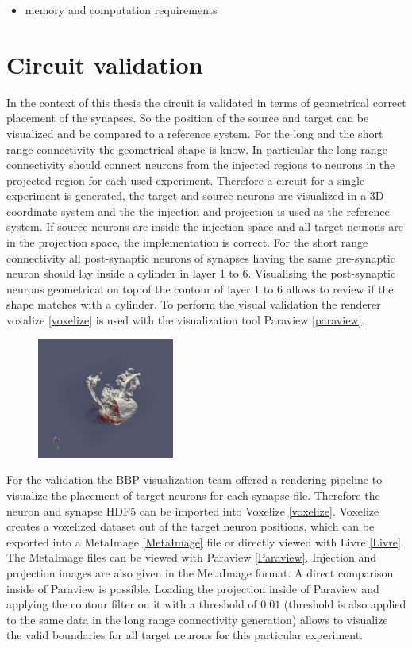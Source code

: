 \begin{itemize}
      \item memory and computation requirements
\end{itemize}


\newpage
\section{Circuit validation}

In the context of this thesis the circuit is validated in terms of geometrical correct placement of
the synapses. So the position of the source and target can be visualized and be compared to a 
reference system. For the long and the short range connectivity the geometrical shape is know.
In particular the long range connectivity should connect neurons from the injected regions to neurons
in the projected region for each used experiment. Therefore a circuit for a single experiment is 
generated, the target and source neurons are visualized in a 3D coordinate system and the the injection
and projection is used as the reference system. If source neurons are inside the injection space and all
target neurons are in the projection space, the implementation is correct.
For the short range connectivity all post-synaptic neurons of synapses having the same pre-synaptic neuron should
lay inside a cylinder in layer 1 to 6. Visualising the post-synaptic neurons geometrical on top of the contour of layer 1 to 6 allows to review if the shape matches with a cylinder.
To perform the visual validation the renderer voxalize \ref{voxelize} is used with the visualization tool Paraview \ref{paraview}.
 \begin{figure}[ht!]
\centering
\includegraphics[width=0.4\textwidth]{pictures/paraview_ex.png}
\end{figure}
For the validation the BBP visualization team offered a rendering pipeline to visualize the placement of target neurons for each synapse file. Therefore the neuron and synapse HDF5 can be imported into 
Voxelize \ref{voxelize}. Voxelize creates a voxelized dataset out of the target neuron positions, which can be exported into
a MetaImage \ref{MetaImage} file or directly viewed with Livre \ref{Livre}.
The MetaImage files can be viewed with Paraview \ref{Paraview}.
Injection and projection images are also given in the MetaImage format.
A direct comparison inside of Paraview is possible.
Loading the projection inside of Paraview and applying the contour filter on it with a threshold of $0.01$ (threshold is also applied to the same data in the long range connectivity generation) allows to visualize the valid boundaries for all target neurons for this particular experiment.
 
